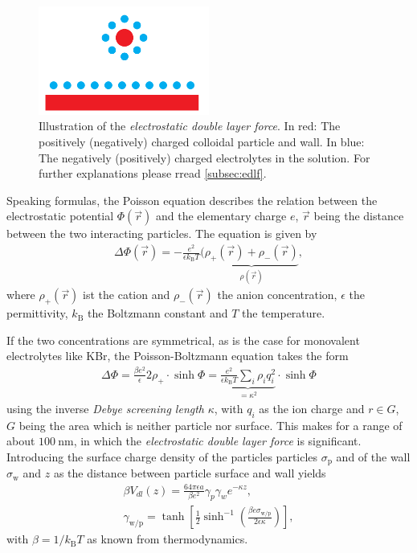 \documentclass[.../bericht]{subfilies}
\begin{document}
    \begin{figure}[b]
      \centering
      \includegraphics[width=0.5\textwidth]{figures/doublelayerforce.pdf}
      \caption{Illustration of the \textit{electrostatic double layer force}. In red: The positively (negatively) charged colloidal particle and wall. In blue: The negatively (positively) charged electrolytes in the solution. For further explanations please rread \cref{subsec:edlf}.}
      \label{fig:edlf}
    \end{figure}

    Speaking formulas, the Poisson equation describes the relation between the electrostatic potential $\Phi (\vec{r})$ and the elementary charge $e$, $\vec{r}$ being the distance between the two interacting particles. The equation is given by
    \begin{align*}
    \Delta \Phi (\vec{r})=-\frac{e^2}{\epsilon k_\mathrm{B} T}(\underbrace{\rho_+(\vec{r})+\rho_-(\vec{r})}_{\rho(\vec{r})},
    \end{align*}
    where $\rho_+(\vec{r})$ ist the cation and $\rho_-(\vec{r})$ the anion concentration, $\epsilon$ the permittivity, $k_\mathrm{B}$ the Boltzmann constant and $T$ the temperature.

    If the two concentrations are symmetrical, as is the case for monovalent electrolytes like KBr, the Poisson-Boltzmann equation takes the form
    \begin{align*}
    \Delta \Phi= \frac{\beta e^2}{\epsilon}2\rho_+ \cdot\sinh\Phi= \underbrace{\frac{e^2}{\epsilon k_\mathrm{B} T}\sum_i \rho_i q_i^2}_{=\kappa^2} \cdot \sinh\Phi
    \end{align*}
    using the inverse \textit{Debye screening length} $\kappa$, with $q_i$ as the ion charge and $r\in G$, $G$ being the area which is neither particle nor surface. This makes for a range of about $\SI{100}{\nano\meter}$, in which the \textit{electrostatic double layer force} is significant. Introducing the surface charge density of the particles particles $\sigma_\mathrm{p}$ and of the wall $\sigma_\mathrm{w}$ and $z$ as the distance between particle surface and wall yields
    \begin{align*}
    \beta V_{dl}(z)=\frac{64\pi \epsilon a}{\beta e^2} \gamma_p \gamma_w e^{-\kappa z}, \\
    \gamma_\mathrm{w/p}=\tanh \left[ \frac{1}{2}\sinh^{-1}  \left( \frac{\beta e \sigma_\mathrm{w/p}}{2\epsilon \kappa } \right) \right],
    \end{align*}
    with $\beta=1/k_\mathrm{B} T$ as known from thermodynamics.
\end{document}
